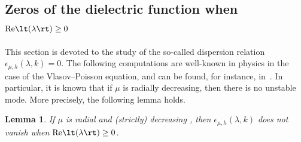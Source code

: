 \documentclass[a4paper,12pt]{amsart} %
\theoremstyle{plain}
\newtheorem{lem}[thm]{Lemma}
\theoremstyle{definition}
\renewcommand	{\(}			{\lt(}
\renewcommand	{\)}			{\rt)}
\DeclareMathOperator{\re}		{Re}				%
\renewcommand	{\Re}[1]		{\re\!\( #1 \)}		%
\newcommand	{\h}			{h}
\begin{document}

\subsection{Zeros of the dielectric function when \texorpdfstring{$\Re\lambda \ge 0$}{lambda has a nonnegative real part}}


	
	This section is devoted to the study of the so-called dispersion relation $\epsilon_{\mu,\h}(\lambda,k) = 0$. The following computations are well-known in physics in the case of the Vlasov--Poisson equation, and can be found, for instance, in~\cite[p.~43]{schekochihin_lectures_2023}. In particular, it is known that if $\mu$ is radially decreasing, then there is no unstable mode. More precisely, the following lemma holds.
		
	\begin{lem}
		If $\mu$ is radial and (strictly) decreasing , then $\epsilon_{\mu,\h}(\lambda,k)$ does not vanish when $\Re \lambda \geq 0$.
	\end{lem}
	
\end{document}
